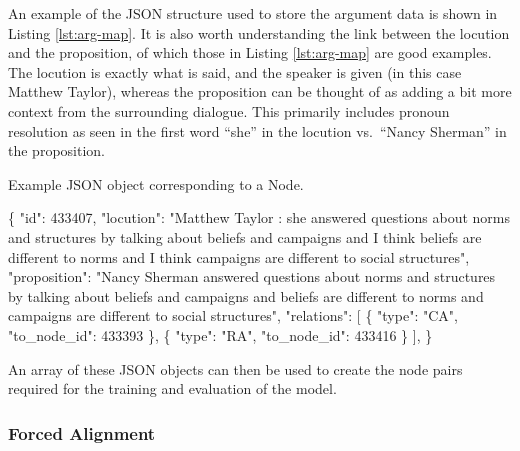 \documentclass[twocolumn]{article}
\newenvironment{Shaded}{}{}
\newcommand{\DataTypeTok}[1]{\textcolor[rgb]{0.56,0.13,0.00}{#1}}
\newcommand{\DecValTok}[1]{\textcolor[rgb]{0.25,0.63,0.44}{#1}}
\newcommand{\FunctionTok}[1]{\textcolor[rgb]{0.02,0.16,0.49}{#1}}
\newcommand{\OtherTok}[1]{\textcolor[rgb]{0.00,0.44,0.13}{#1}}
\newcommand{\StringTok}[1]{\textcolor[rgb]{0.25,0.44,0.63}{#1}}
\begin{document}
An example of the JSON structure used to store the argument data is
shown in Listing \ref{lst:arg-map}. It is also worth understanding the
link between the locution and the proposition, of which those in Listing
\ref{lst:arg-map} are good examples. The locution is exactly what is
said, and the speaker is given (in this case Matthew Taylor), whereas
the proposition can be thought of as adding a bit more context from the
surrounding dialogue. This primarily includes pronoun resolution as seen
in the first word ``she'' in the locution vs.~``Nancy Sherman'' in the
proposition.

\begin{codelisting}

\caption{Example JSON object corresponding to a Node.}\label{lst:arg-map}

\begin{Shaded}
\begin{Highlighting}[numbers=left,,]
\FunctionTok{\{}
    \DataTypeTok{"id"}\FunctionTok{:} \DecValTok{433407}\FunctionTok{,}
    \DataTypeTok{"locution"}\FunctionTok{:} \StringTok{"Matthew Taylor : she answered questions about norms and structures by talking about beliefs and campaigns and I think beliefs are different to norms and I think campaigns are different to social structures"}\FunctionTok{,}
    \DataTypeTok{"proposition"}\FunctionTok{:} \StringTok{"Nancy Sherman answered questions about norms and structures by talking about beliefs and campaigns and beliefs are different to norms and campaigns are different to social structures"}\FunctionTok{,}
    \DataTypeTok{"relations"}\FunctionTok{:} \OtherTok{[}
        \FunctionTok{\{}
            \DataTypeTok{"type"}\FunctionTok{:} \StringTok{"CA"}\FunctionTok{,}
            \DataTypeTok{"to\_node\_id"}\FunctionTok{:} \DecValTok{433393}
        \FunctionTok{\}}\OtherTok{,}
        \FunctionTok{\{}
            \DataTypeTok{"type"}\FunctionTok{:} \StringTok{"RA"}\FunctionTok{,}
            \DataTypeTok{"to\_node\_id"}\FunctionTok{:} \DecValTok{433416}
        \FunctionTok{\}}
    \OtherTok{]}\FunctionTok{,}
\FunctionTok{\}}
\end{Highlighting}
\end{Shaded}

\end{codelisting}

An array of these JSON objects can then be used to create the node pairs
required for the training and evaluation of the model.

\subsubsection{Forced Alignment}\label{forced-alignment}
\end{document}
